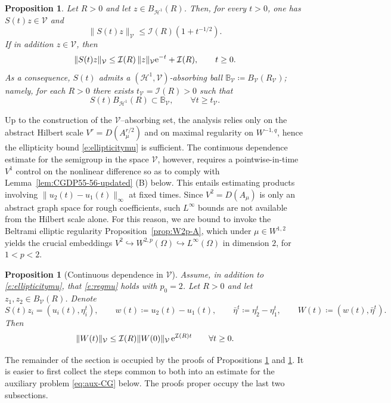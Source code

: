 \documentclass[12pt,leqno]{amsart}
\def\e{{\rm e}}
\newtheorem{proposition}[theorem]{Proposition}
\theoremstyle{definition}
\numberwithin{equation}{section}
\numberwithin{figure}{section}
\begin{document}
\begin{proposition} \label{prop:V-smoothing}
Let $R>0$ and let $z\in B_{\mathcal H^1}(R)$. Then, for every $t>0$, one has $S(t)z\in\mathcal V$ and
\begin{equation}\label{eq:V-smoothing-est}
\|S(t)z\|_{\mathcal V}\le \mathcal I(R)\left(1+t^{-1/2}\right).
\end{equation}
If in addition $z\in \mathcal V$, then
\begin{equation}\label{eq:V-smoothing-est-V0}
\|S(t)z\|_{\mathcal V}\le \mathcal I(R)\,\|z\|_{\mathcal V}\e^{-t}+\mathcal I(R), \qquad t\ge 0.
\end{equation}
As a consequence, $S(t)$ admits a $({\mathcal H^1},\mathcal V)$-absorbing ball  $\mathbb B_{\mathcal V}\coloneqq B_{\mathcal V}(R_{\mathcal V})$; namely, for each $R>0$ there exists $t_{\mathcal V}=\mathcal I(R)>0$ such that
\[
S(t)B_{\mathcal H^1}(R)\subset \mathbb B_{\mathcal V},\qquad \forall t\ge t_{\mathcal V}.
\]

\end{proposition}
Up to the construction of the $\mathcal V$--absorbing set, the analysis relies only on the abstract Hilbert scale
$V^r=D(A_\mu^{r/2})$ and on maximal regularity on $W^{-1,q}$, hence the ellipticity bound \eqref{e:ellipticitymu} is sufficient. 
The continuous dependence estimate for the semigroup in the space  $\mathcal V$, however, requires a pointwise-in-time ${V^1}$  control on  the nonlinear
difference so as to comply with Lemma~\ref{lem:CGDP55-56-updated} \textup{(B)} below. 
This entails estimating products involving
$\|u_2(t)-u_1(t)\|_{\infty}$ at fixed times. 
Since ${V^2}=D(A_\mu)$ is only an abstract graph space for rough coefficients, such $L^\infty$ bounds are not available
from the Hilbert scale alone. For this reason, we are bound to invoke the Beltrami elliptic regularity
Proposition~\ref{prop:W2p-A}, which under $\mu\in W^{1,2}$  yields the
crucial embeddings ${V^2}\hookrightarrow W^{2,p}(\Omega)\hookrightarrow L^\infty(\Omega)$ in dimension $2$, for $1<p<2.$


\begin{proposition}[Continuous dependence in $\mathcal V$]\label{prop:contdep-V}
Assume, in addition to \eqref{e:ellipticitymu}, that \eqref{e:regmu} holds with $p_0= 2$.
Let $R>0$ and let $z_1,z_2\in B_{\mathcal V}(R)$. Denote
\[
S(t)z_i=(u_i(t),\eta_i^t),\qquad w(t)\coloneqq u_2(t)-u_1(t),\qquad \bar\eta^t\coloneqq \eta_2^t-\eta_1^t,
\qquad W(t)\coloneqq (w(t),\bar\eta^t).
\]
Then  
\begin{equation}\label{eq:contdep-V}
\|W(t)\|_{\mathcal V}\le \mathcal I(R)\|W(0)\|_{\mathcal V}\,\e^{\mathcal I(R) t}\qquad \forall t\ge 0.
\end{equation}
\end{proposition}
The remainder of the section is occupied by the proofs of Propositions \ref{prop:V-smoothing} and \ref{prop:contdep-V}. It is easier to first collect the steps common to both into an estimate for the auxiliary problem \eqref{eq:aux-CG} below. The proofs proper occupy the last two subsections.
\end{document}
